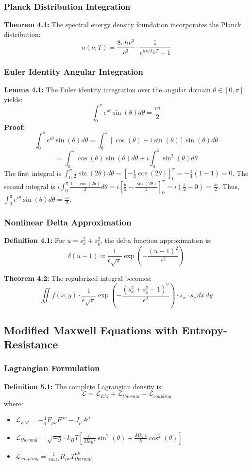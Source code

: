 ﻿\documentclass[12pt]{article}
\begin{document}
\subsubsection{Planck Distribution Integration}
\textbf{Theorem 4.1:} The spectral energy density foundation incorporates the Planck distribution:
$$u(\nu,T) = \frac{8\pi h\nu^3}{c^3} \cdot \frac{1}{e^{h\nu/k_BT} - 1}$$

\subsubsection{Euler Identity Angular Integration}
\textbf{Lemma 4.1:} The Euler identity integration over the angular domain $\theta \in [0,\pi]$ yields:
$$\int_0^\pi e^{i\theta} \sin(\theta) d\theta = \frac{\pi i}{2}$$
\textbf{Proof:}
$$ \int_0^\pi e^{i\theta} \sin(\theta) d\theta = \int_0^\pi [\cos(\theta) + i\sin(\theta)]\sin(\theta) d\theta $$
$$ = \int_0^\pi \cos(\theta)\sin(\theta) d\theta + i\int_0^\pi \sin^2(\theta) d\theta $$
The first integral is $\int_0^\pi \frac{1}{2}\sin(2\theta) d\theta = [-\frac{1}{4}\cos(2\theta)]_0^\pi = -\frac{1}{4}(1-1) = 0$.
The second integral is $i\int_0^\pi \frac{1-\cos(2\theta)}{2} d\theta = i\left[\frac{\theta}{2} - \frac{\sin(2\theta)}{4}\right]_0^\pi = i\left(\frac{\pi}{2} - 0\right) = \frac{\pi i}{2}$.
Thus, $\int_0^\pi e^{i\theta} \sin(\theta) d\theta = \frac{\pi i}{2}$.

\subsubsection{Nonlinear Delta Approximation}
\textbf{Definition 4.1:} For $u = s_x^2 + s_y^2$, the delta function approximation is:
$$\delta(u - 1) \approx \frac{1}{\epsilon\sqrt{\pi}} \exp\left(-\frac{(u-1)^2}{\epsilon^2}\right)$$

\textbf{Theorem 4.2:} The regularized integral becomes:
$$\iint f(x,y) \cdot \frac{1}{\epsilon\sqrt{\pi}} \exp\left(-\frac{(s_x^2 + s_y^2 - 1)^2}{\epsilon^2}\right) \cdot s_x \cdot s_y \, dx \, dy$$

\subsection{Modified Maxwell Equations with Entropy-Resistance}

\subsubsection{Lagrangian Formulation}
\textbf{Definition 5.1:} The complete Lagrangian density is:
$$\mathcal{L} = \mathcal{L}_{EM} + \mathcal{L}_{thermal} + \mathcal{L}_{coupling}$$
where:
\begin{itemize}
   \item $\mathcal{L}_{EM} = -\frac{1}{4}F_{\mu\nu}F^{\mu\nu} - J_\mu A^\mu$
   \item $\mathcal{L}_{thermal} = \sqrt{-g} \cdot k_B T \left[\frac{\hbar}{Mk_Bc}\sin^2(\theta) + \frac{Mk_Bc}{\hbar}\cos^2(\theta)\right]$
   \item $\mathcal{L}_{coupling} = \frac{1}{16\pi G} R_{\mu\nu} T^{\mu\nu}_{thermal}$
\end{itemize}
\end{document}
